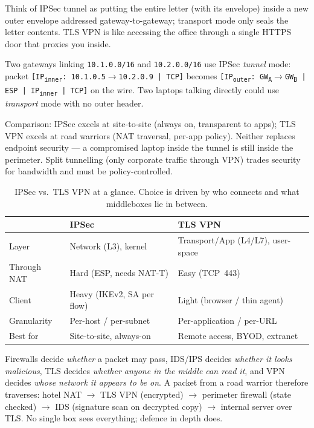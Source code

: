 Think of IPSec tunnel as putting the entire letter (with its envelope) inside a new outer envelope addressed gateway-to-gateway; transport mode only seals the letter contents. TLS VPN is like accessing the office through a single HTTPS door that proxies you inside.

\begin{example}
Two gateways linking \texttt{10.1.0.0/16} and \texttt{10.2.0.0/16} use IPSec \emph{tunnel} mode: packet \texttt{[IP\textsubscript{inner}: 10.1.0.5$\to$10.2.0.9 | TCP]} becomes \texttt{[IP\textsubscript{outer}: GW\textsubscript{A}$\to$GW\textsubscript{B} | ESP | IP\textsubscript{inner} | TCP]} on the wire. Two laptops talking directly could use \emph{transport} mode with no outer header.
\end{example}

Comparison: IPSec excels at site-to-site (always on, transparent to apps); TLS VPN excels at road warriors (NAT traversal, per-app policy). Neither replaces endpoint security --- a compromised laptop inside the tunnel is still inside the perimeter. Split tunnelling (only corporate traffic through VPN) trades security for bandwidth and must be policy-controlled.

\begin{table}[h]\centering\small
\begin{tabular}{l l l}
\toprule & \textbf{IPSec} & \textbf{TLS VPN} \\\midrule
Layer & Network (L3), kernel & Transport/App (L4/L7), user-space \\
Through NAT & Hard (ESP, needs NAT-T) & Easy (TCP~443) \\
Client & Heavy (IKEv2, SA per flow) & Light (browser / thin agent) \\
Granularity & Per-host / per-subnet & Per-application / per-URL \\
Best for & Site-to-site, always-on & Remote access, BYOD, extranet \\\bottomrule
\end{tabular}
\caption{IPSec vs.\ TLS VPN at a glance. Choice is driven by who connects and what middleboxes lie in between.}
\end{table}

\begin{remark}
Firewalls decide \emph{whether} a packet may pass, IDS/IPS decides \emph{whether it looks malicious}, TLS decides \emph{whether anyone in the middle can read it}, and VPN decides \emph{whose network it appears to be on}. A packet from a road warrior therefore traverses: hotel NAT $\to$ TLS VPN (encrypted) $\to$ perimeter firewall (state checked) $\to$ IDS (signature scan on decrypted copy) $\to$ internal server over TLS. No single box sees everything; defence in depth does.
\end{remark}

